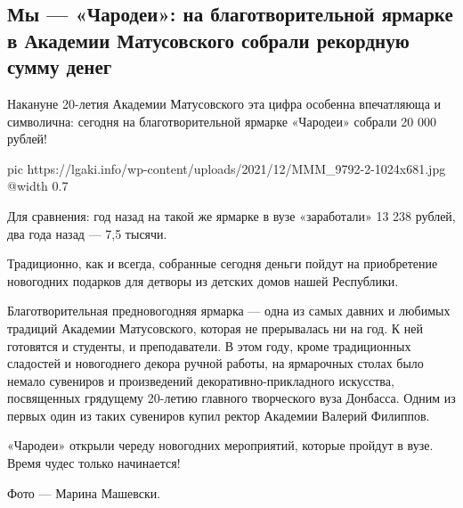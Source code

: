  
 
 
 
 
\subsection{Мы — «Чародеи»: на благотворительной ярмарке в Академии Матусовского собрали рекордную сумму денег}
\label{sec:15_12_2021.stz.edu.lnr.lgaki.1.charodei_jarmarka}


Накануне 20-летия Академии Матусовского эта цифра особенна впечатляюща и
символична: сегодня на благотворительной ярмарке «Чародеи» собрали 20 000
рублей!

\ifcmt
  pic https://lgaki.info/wp-content/uploads/2021/12/MMM_9792-2-1024x681.jpg
  @width 0.7
\fi

Для сравнения: год назад на такой же ярмарке в вузе «заработали» 13 238 рублей,
два года назад — 7,5 тысячи.

Традиционно, как и всегда, собранные сегодня деньги пойдут на приобретение
новогодних подарков для детворы из детских домов нашей Республики. 


Благотворительная предновогодняя ярмарка — одна из самых давних и любимых
традиций Академии Матусовского, которая не прерывалась ни на год. К ней
готовятся и студенты, и преподаватели. В этом году, кроме традиционных
сладостей и новогоднего декора ручной работы, на ярмарочных столах было немало
сувениров и произведений декоративно-прикладного искусства, посвященных
грядущему 20-летию главного творческого вуза Донбасса. Одним из первых один из
таких сувениров купил ректор Академии Валерий Филиппов.


«Чародеи» открыли череду новогодних мероприятий, которые пройдут в вузе. Время
чудес только начинается!

Фото — Марина Машевски.

